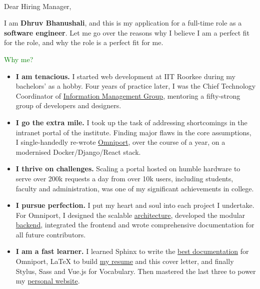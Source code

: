 \begin{multicols}{2}[]
  
  \columnbreak  
  \\
\end{multicols}

\setlength{\parskip}{\baselineskip} %
\vspace{-0.5cm}
Dear Hiring Manager,

I am \textbf{Dhruv Bhanushali}, and this is my application for a full-time role
as a \textbf{software engineer}. Let me go over the reasons why I believe I am a
perfect fit for the role, and why the role is a perfect fit for me.

\textcolor{green}{Why me?}
\begin{itemize}[nosep, parsep=1mm, leftmargin=*]
  \item \textbf{I am tenacious.} I started web development at IIT Roorkee during
  my bachelors' as a hobby. Four years of practice later, I was the Chief
  Technology Coordinator of
  \href{https://https://internet.channeli.in/maintainer_site/}{Information
  Management Group}, mentoring a fifty-strong group of developers and designers.

  \item \textbf{I go the extra mile.} I took up the task of addressing
  shortcomings in the intranet portal of the institute. Finding major flaws in
  the core assumptions, I single-handedly re-wrote
  \href{https://omniport.readthedocs.io}{Omniport}, over the course of a year,
  on a modernised Docker/Django/React stack.

  \item \textbf{I thrive on challenges.} Scaling a portal hosted on humble
  hardware to serve over 200k requests a day from over 10k users, including
  students, faculty and administration, was one of my significant achievements
  in college.

  \item \textbf{I pursue perfection.} I put my heart and soul into each project
  I undertake. For Omniport, I designed the scalable
  \href{https://github.com/IMGIITRoorkee/omniport-docker/}{architecture},
  developed the modular
  \href{https://github.com/IMGIITRoorkee/omniport-backend/}{backend}, integrated
  the frontend and wrote comprehensive documentation for all future
  contributors.

  \item \textbf{I am a fast learner.} I learned Sphinx to write the
  \href{https://github.com/IMGIITRoorkee/omniport-docs/}{best documentation} for
  Omniport, {\selectfont\LaTeX} to build
  \href{https://github.com/dhruvkb/resume/}{my resume} and this cover letter,
  and finally Stylus, Sass and Vue.js for Vocabulary. Then mastered the last
  three to power my \href{https://dhruvkb.github.io/}{personal website}.


\end{itemize}
